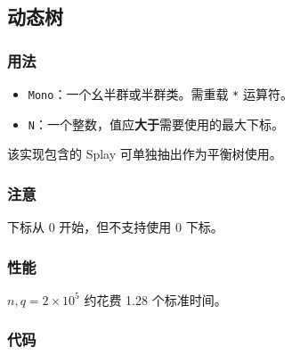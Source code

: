 \subsection{动态树}

\subsubsection{用法}

\begin{itemize}
\item \lstinline{Mono}：一个幺半群或半群类。需重载 \lstinline{*} 运算符。
\item \lstinline{N}：一个整数，值应\textbf{大于}需要使用的最大下标。
\end{itemize}

该实现包含的 Splay 可单独抽出作为平衡树使用。

\subsubsection{注意}

下标从 0 开始，但不支持使用 0 下标。

\subsubsection{性能}

$n, q = 2\times 10^5$ 约花费 1.28 个标准时间。

\subsubsection{代码}


